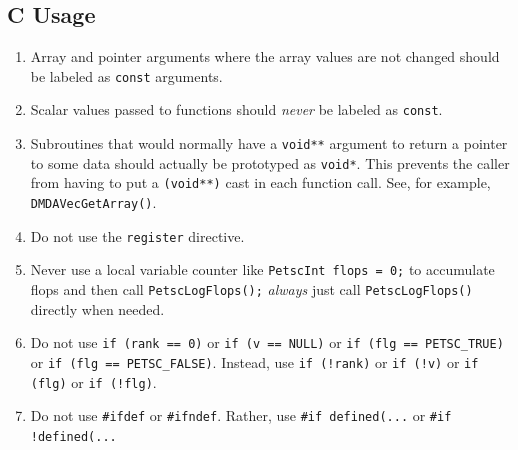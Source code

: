 \subsection{C Usage}
\begin{enumerate}
\item Array and pointer arguments where the array values are not changed should be labeled as \lstinline{const} arguments.
\item Scalar values passed to functions should {\em never} be labeled as \lstinline{const}.
\item Subroutines that would normally have a \lstinline{void**} argument to return a pointer to some data should
actually be prototyped as \lstinline{void*}. This prevents the caller from having to put a \lstinline{(void**)} cast in each function call. See, for example, \lstinline{DMDAVecGetArray()}.
\item Do not use the \lstinline{register} directive.
\item Never use a local variable counter like \lstinline{PetscInt flops = 0;} to accumulate flops and then call \lstinline{PetscLogFlops();} {\em always} just
  call \lstinline{PetscLogFlops()} directly when needed.
\item Do not use \lstinline{if (rank == 0)} or \lstinline{if (v == NULL)} or \lstinline{if (flg == PETSC_TRUE)} or \lstinline{if (flg == PETSC_FALSE)}.
Instead, use \lstinline{if (!rank)} or \lstinline{if (!v)} or \lstinline{if (flg)} or \lstinline{if (!flg)}.
\item Do not use \lstinline{#ifdef} or \lstinline{#ifndef}. Rather, use \lstinline{#if defined(...} or \lstinline{#if !defined(...}
\end{enumerate}

